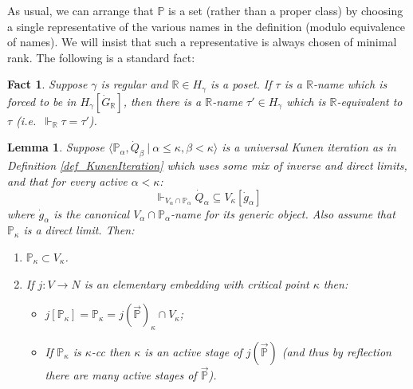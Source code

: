 \documentclass{amsart}
\newtheorem{lemma}[theorem]{Lemma}
\newtheorem{fact}[theorem]{Fact}
\begin{document}
As usual, we can arrange that $\mathbb{P}$ is a set (rather than a proper class) by choosing a single representative of the various names in the definition (modulo equivalence of names).  We will insist that such a representative is always chosen of minimal rank.  The following is a standard fact:
\begin{fact}\label{fact_NamesInModel}
Suppose $\gamma$ is regular and $\mathbb{R} \in H_\gamma$ is a poset.  If $\tau$ is a $\mathbb{R}$-name which is forced to be in $H_\gamma[\dot{G}_{\mathbb{R}}]$, then there is a $\mathbb{R}$-name $\tau' \in H_\gamma$ which is $\mathbb{R}$-equivalent to $\tau$ (i.e.\ $\Vdash_{\mathbb{R}} \tau = \tau'$).
\end{fact}

\begin{lemma}\label{lem_SubsetVkappa}
Suppose $\langle \mathbb{P}_\alpha, \dot{Q}_\beta \ | \ \alpha  \le \kappa, \beta < \kappa \rangle$ is a universal Kunen iteration as in Definition \ref{def_KunenIteration} which uses some mix of inverse and direct limits, and that for every active $\alpha < \kappa$:
\begin{equation}\label{eq_AssumeInVkappa}
\Vdash_{V_\alpha \cap \mathbb{P}_\alpha} \dot{Q}_\alpha \subseteq V_\kappa[\dot{g}_\alpha]
\end{equation}
where $\dot{g}_\alpha$ is the canonical $V_\alpha \cap \mathbb{P}_\alpha$-name for its generic object.  Also assume that $\mathbb{P}_\kappa$ is a direct limit.  Then:
\begin{enumerate}
 \item\label{item_CanWLOGassumeVkappa} $\mathbb{P}_\kappa \subset V_\kappa$.
 \item\label{item_IfYouHaveEmbedding} If $j: V \to N$ is an elementary embedding with critical point $\kappa$ then:
 \begin{itemize}
  \item $j[\mathbb{P}_\kappa] = \mathbb{P}_\kappa = j(\vec{\mathbb{P}})_\kappa \cap V_\kappa$;
  \item If $\mathbb{P}_\kappa$ is $\kappa$-cc then $\kappa$ is an active stage of $j(\vec{\mathbb{P}})$ (and thus by reflection there are many active stages of $\vec{\mathbb{P}}$).
 \end{itemize}
\end{enumerate}
\end{lemma}
\end{document}
